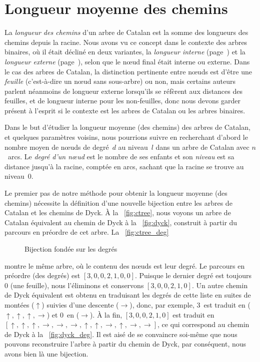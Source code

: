 \section{Longueur moyenne des chemins}

La \emph{longueur des chemins} d'un arbre de Catalan est la somme des
longueurs des chemins depuis la racine. Nous avons vu ce concept dans
le contexte des arbres binaires, où il était décliné en deux
variantes, la \emph{longueur interne}
(page~\pageref{insertion__internal_path_length}) et la \emph{longueur
  externe} (page~\pageref{sorting__external_path_length}), selon que
le n{\oe}ud final était interne ou externe. Dans le cas des arbres de
Catalan, la distinction pertinente entre n{\oe}uds est d'être une
\emph{feuille} (c'est-à-dire un n{\oe}ud sans sous-arbre) ou non, mais
certains auteurs parlent néanmoins de longueur externe lorsqu'ils se
réfèrent aux distances des feuilles, et de longueur interne pour les
non-feuilles, donc nous devons garder présent à l'esprit si le
contexte est les arbres de Catalan ou les arbres binaires.

Dans le but d'étudier la longueur moyenne (des chemins) des arbres de
Catalan, et quelques paramètres voisins, nous pourrions suivre
\cite{DershowitzZaks_1981} en recherchant d'abord le nombre moyen de
n{\oe}uds de degré~\(d\) au niveau~\(l\) dans un arbre de Catalan
avec \(n\)~arcs. Le \emph{degré d'un n{\oe}ud} est le nombre de ses
enfants et son \emph{niveau} est sa distance jusqu'à la racine,
comptée en arcs, sachant que la racine se trouve au niveau~\(0\).

Le premier pas de notre méthode pour obtenir la longueur moyenne (des
chemins) nécessite la définition d'une nouvelle bijection entre les
arbres de Catalan et les chemins de Dyck. À la \fig~\vref{fig:ctree},
nous voyons un arbre de Catalan équivalent au chemin de Dyck à la
\fig~\ref{fig:dyck}, construit à partir du parcours en préordre de cet
arbre. La \fig~\ref{fig:ctree_deg}
\begin{figure}
\centering
{}
\qquad
{}
\caption{Bijection fondée sur les degrés}
\label{fig:degree_based_bijection}
\end{figure}
montre le même arbre, où le contenu des n{\oe}uds est leur degré. Le
parcours en préordre (des degrés) est \([3,0,0,2,1,0,0]\). Puisque le
dernier degré est toujours~\(0\) (une feuille), nous l'éliminons et
conservons \([3,0,0,2,1,0]\). Un autre chemin de Dyck équivalent est
obtenu en traduisant les degrés de cette liste en suites de montées
(\(\uparrow\)) suivies d'une descente (\(\rightarrow\)), donc, par
exemple, \(3\)~est traduit en (\(\uparrow, \uparrow, \uparrow,
\rightarrow\)) et \(0\)~en (\(\rightarrow\)). À la fin,
\([3,0,0,2,1,0]\) est traduit en \([\uparrow, \uparrow, \uparrow,
\rightarrow, \rightarrow, \rightarrow, \uparrow, \uparrow,
\rightarrow, \uparrow, \rightarrow, \rightarrow]\), ce qui correspond
au chemin de Dyck à la \fig~\ref{fig:dyck_deg}. Il est aisé de se
convaincre soi-même que nous pouvons reconstruire l'arbre à partir du
chemin de Dyck, par conséquent, nous avons bien là une bijection.

